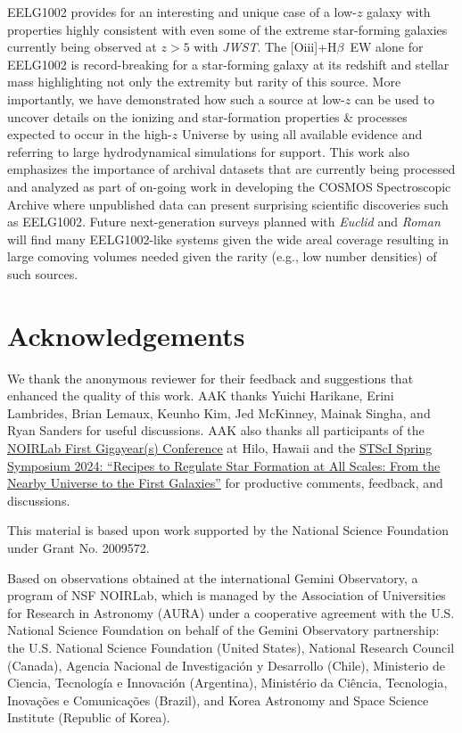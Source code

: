 \documentclass[twocolumn,tight,times,linenumbers]{aastex631}
\newcommand{\hbeta}{H$\beta$}
\newcommand{\oiii}{[O{\sc iii}]}
\begin{document}
		EELG1002 provides for an interesting and unique case of a low-$z$ galaxy with properties highly consistent with even some of the extreme star-forming galaxies currently being observed at $z > 5$ with \textit{JWST}. The \oiii+\hbeta~EW alone for EELG1002 is record-breaking for a star-forming galaxy at its redshift and stellar mass highlighting not only the extremity but rarity of this source. More importantly, we have demonstrated how such a source at low-$z$ can be used to uncover details on the ionizing and star-formation properties \& processes expected to occur in the high-$z$ Universe by using all available evidence and referring to large hydrodynamical simulations for support. This work also emphasizes the importance of archival datasets that are currently being processed and analyzed as part of on-going work in developing the COSMOS Spectroscopic Archive where unpublished data can present surprising scientific discoveries such as EELG1002. Future next-generation surveys planned with \textit{Euclid} and \textit{Roman} will find many EELG1002-like systems given the wide areal coverage resulting in large comoving volumes needed given the rarity (e.g., low number densities) of such sources.
		
		
		
		\section*{Acknowledgements}
		
		We thank the anonymous reviewer for their feedback and suggestions that enhanced the quality of this work. AAK thanks Yuichi Harikane, Erini Lambrides, Brian Lemaux, Keunho Kim, Jed McKinney, Mainak Singha, and Ryan Sanders for useful discussions. AAK also thanks all participants of the \href{https://noirlab.edu/science/events/websites/first-gigayears-2024}{NOIRLab First Gigayear(s) Conference} at Hilo, Hawaii and the \href{https://www.stsci.edu/contents/events/stsci/2024/april/recipes-to-regulate-star-formation-at-all-scales}{STScI Spring Symposium 2024: ``Recipes to Regulate Star Formation at All Scales: From the Nearby Universe to the First Galaxies''} for productive comments, feedback, and discussions. %

        This material is based upon work supported by the National Science Foundation under Grant No. 2009572.
		
		Based on observations obtained at the international Gemini Observatory, a program of NSF NOIRLab, which is managed by the Association of Universities for Research in Astronomy (AURA) under a cooperative agreement with the U.S. National Science Foundation on behalf of the Gemini Observatory partnership: the U.S. National Science Foundation (United States), National Research Council (Canada), Agencia Nacional de Investigaci\'{o}n y Desarrollo (Chile), Ministerio de Ciencia, Tecnolog\'{i}a e Innovaci\'{o}n (Argentina), Minist\'{e}rio da Ci\^{e}ncia, Tecnologia, Inova\c{c}\~{o}es e Comunica\c{c}\~{o}es (Brazil), and Korea Astronomy and Space Science Institute (Republic of Korea).
		
\end{document}
